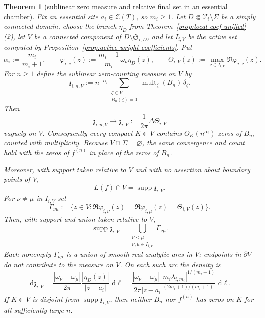 \documentclass[reqno]{article}
\newtheorem{theorem}{Theorem}
\theoremstyle{definition}
\theoremstyle{remark}
\theoremstyle{plain}
\newcommand{\Z}{\mathcal Z}
\newcommand{\dd}{\,\mathrm d}
\begin{document}
\begin{theorem}[sublinear zero measure and relative final set in an essential chamber]\label{thm:sublinear-essential}
Fix an essential site $a_i\in\Z(T)$, so $m_i\ge1$. Let $D\Subset\mathcal V_i^\circ\setminus\Sigma$ be a simply connected domain, choose the branch $\eta_D$ from Theorem~\ref{prop:local-coef-unified}\textup{(2)}, let $V$ be a connected component of $D\setminus\mathfrak S_{i,D}$, and let $I_{i,V}$ be the active set computed by Proposition~\ref{prop:active-wright-coefficients}. Put
\[
\alpha_i:=\frac{m_i}{m_i+1},\qquad
\varphi_{i,\nu}(z):=\frac{m_i+1}{m_i}\,\omega_\nu\eta_D(z),\qquad
\Theta_{i,V}(z):=\max_{\nu\in I_{i,V}}\Re\varphi_{i,\nu}(z).
\]
For $n\ge1$ define the sublinear zero-counting measure on $V$ by
\[
\mathfrak z_{i,n,V}:=n^{-\alpha_i}
\sum_{\substack{\zeta\in V\\ B_n(\zeta)=0}}
\operatorname{mult}_\zeta(B_n)\,\delta_\zeta .
\]
Then
\[
\mathfrak z_{i,n,V}\longrightarrow
\mathfrak z_{i,V}:=\frac{1}{2\pi}\Delta\Theta_{i,V}
\]
vaguely on $V$. Consequently every compact $K\Subset V$ contains $O_K(n^{\alpha_i})$ zeros of $B_n$, counted with multiplicity. Because $V\cap\Sigma=\varnothing$, the same convergence and count hold with the zeros of $f^{(n)}$ in place of the zeros of $B_n$.

Moreover, with support taken relative to $V$ and with no assertion about boundary points of $V$,
\[
L(f)\cap V=\operatorname{supp}\mathfrak z_{i,V}.
\]
For $\nu\ne\mu$ in $I_{i,V}$ set
\[
\Gamma_{\nu\mu}:=
\{z\in V:\Re\varphi_{i,\nu}(z)=\Re\varphi_{i,\mu}(z)=\Theta_{i,V}(z)\}.
\]
Then, with support and union taken relative to $V$,
\[
\operatorname{supp}\mathfrak z_{i,V}
=\bigcup_{\substack{\nu<\mu\\ \nu,\mu\in I_{i,V}}}\Gamma_{\nu\mu}.
\]
Each nonempty $\Gamma_{\nu\mu}$ is a union of smooth real-analytic arcs in $V$; endpoints in $\partial V$ do not contribute to the measure on $V$. On each such arc the density is
\[
\dd\mathfrak z_{i,V}
=\frac{|\omega_\nu-\omega_\mu|}{2\pi}\frac{|\eta_D(z)|}{|z-a_i|}\,\dd\ell
=\frac{|\omega_\nu-\omega_\mu|\,|m_i\lambda_{i,m_i}|^{1/(m_i+1)}}{2\pi |z-a_i|^{(2m_i+1)/(m_i+1)}}\,\dd\ell .
\]
If $K\Subset V$ is disjoint from $\operatorname{supp}\mathfrak z_{i,V}$, then neither $B_n$ nor $f^{(n)}$ has zeros on $K$ for all sufficiently large $n$.
\end{theorem}
\end{document}
